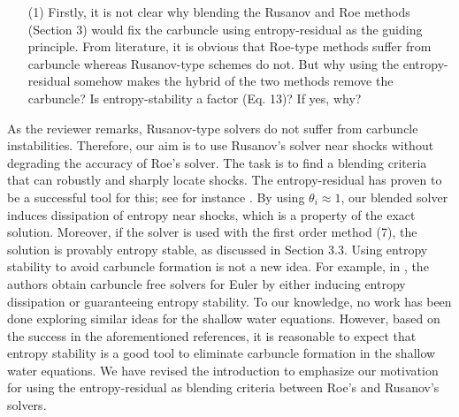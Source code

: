 \documentclass[english,11pt]{article}
\begin{document}
\bigskip
{\color{red}
  \begin{itemize}
    \item[(1)]
      Firstly, it is not clear why blending the Rusanov and Roe methods (Section 3) would fix the carbuncle
      using entropy-residual as the guiding principle. From literature, it is obvious that Roe-type methods suffer
      from carbuncle whereas Rusanov-type schemes do not. But why using the entropy-residual somehow
      makes the hybrid of the two methods remove the carbuncle? Is entropy-stability a factor (Eq. 13)? If yes,
      why?
  \end{itemize}
}
\noindent
As the reviewer remarks, Rusanov-type solvers do not suffer from carbuncle instabilities. Therefore,
our aim is to use Rusanov's solver near shocks without degrading the accuracy of Roe's solver.
The task is to find a blending criteria that can robustly and sharply locate shocks.
The entropy-residual has proven to be a successful tool for this; see for instance \cite{guermond2011,guermond2018}. 
%
By using $\theta_i\approx 1$, our blended solver induces dissipation of entropy near shocks,
which is a property of the exact solution. Moreover, if the solver is used with the first order method (7),
the solution is provably entropy stable, as discussed in Section 3.3.
Using entropy stability to avoid carbuncle formation is not a new idea. For example, in \cite{ismail2009,ismail2009v2},
the authors obtain carbuncle free solvers for Euler by either inducing entropy dissipation or guaranteeing entropy stability. 
To our knowledge, no work has been done exploring similar ideas for the shallow water equations. However, based on
the success in the aforementioned references, it is reasonable to expect that entropy stability is a good tool to
eliminate carbuncle formation in the shallow water equations. 
%
We have revised the introduction to emphasize our motivation for using the entropy-residual as blending
criteria between Roe's and Rusanov's solvers. 
\end{document}
